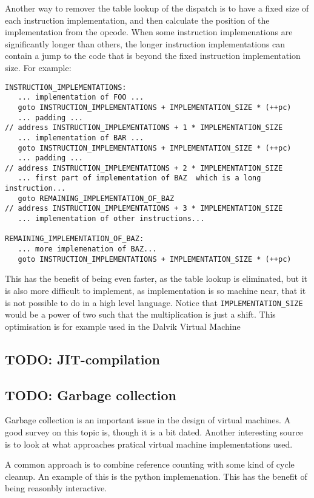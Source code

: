 Another way to remover the table lookup of the dispatch is to have a fixed size of each instruction implementation, and then calculate the position of the implementation from the opcode. When some instruction implemenations are significantly longer than others, the longer instruction implementations can contain a jump to the code that is beyond the fixed instruction implementation size.
For example:
\begin{verbatim}
INSTRUCTION_IMPLEMENTATIONS:
   ... implementation of FOO ...
   goto INSTRUCTION_IMPLEMENTATIONS + IMPLEMENTATION_SIZE * (++pc)
   ... padding ...
// address INSTRUCTION_IMPLEMENTATIONS + 1 * IMPLEMENTATION_SIZE
   ... implementation of BAR ...
   goto INSTRUCTION_IMPLEMENTATIONS + IMPLEMENTATION_SIZE * (++pc)
   ... padding ...
// address INSTRUCTION_IMPLEMENTATIONS + 2 * IMPLEMENTATION_SIZE
   ... first part of implementation of BAZ  which is a long instruction...
   goto REMAINING_IMPLEMENTATION_OF_BAZ
// address INSTRUCTION_IMPLEMENTATIONS + 3 * IMPLEMENTATION_SIZE
   ... implementation of other instructions...

REMAINING_IMPLEMENTATION_OF_BAZ:
   ... more implemenation of BAZ...
   goto INSTRUCTION_IMPLEMENTATIONS + IMPLEMENTATION_SIZE * (++pc)
\end{verbatim}
This has the benefit of being even faster, as the table lookup is eliminated,
but it is also more difficult to implement, as implementation is so 
machine near, that it is not possible to do in a high level language.
Notice that \verb|IMPLEMENTATION_SIZE| would be a power of two such that the multiplication is just a shift.
This optimisation is for example used in the Dalvik Virtual Machine\cite{dalvik-vm}


\subsection{TODO: JIT-compilation}

\subsection{TODO: Garbage collection}
Garbage collection is an important issue in the design of virtual machines. 
A good survey on this topic is\cite{gc-survey}, though it is a bit dated.
Another interesting source is to look at what approaches pratical virtual machine implementations used.

A common approach is to combine reference counting with some kind of cycle cleanup. 
An example of this is the python implemenation. 
This has the benefit of being reasonbly interactive. 

